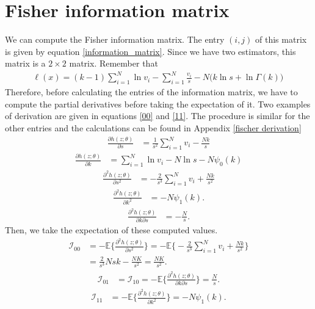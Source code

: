 \documentclass[final]{aomart}
\newtheorem[{}\it]{thm}{Theorem}[section]
\theoremstyle{definition}
\newtheorem*[{}\it]{notation}{Notation}
\numberwithin{equation}{section}
\newcommand{\fisher}{\mathcal{I}} %
\begin{document}
\section{Fisher information matrix}
We can compute the Fisher information matrix. The entry $(i,j)$ of this matrix is given by equation \ref{information_matrix}. Since we have two estimators, this matrix is a $2\times 2$ matrix. Remember that
\begin{align}
	\ell(x) = (k-1) \sum_{i=1}^{N}\ln v_i - \sum_{i=1}^{N} \frac{v_i}{s} - N \big(k \ln s + \ln \Gamma(k)\big)\,
\end{align}
Therefore, before calculating the entries of the information matrix, we have to compute the partial derivatives before taking the expectation of it. Two examples of derivation are given in equations \ref{00} and \ref{11}. The procedure is similar for the other entries and the calculations can be found in Appendix \ref{fischer derivation}
\begin{align}
	\frac{\partial h(z;\theta)}{\partial s} & = \frac{1}{s^2}\sum_{i=1}^{N}v_i - \frac{Nk}{s}
\end{align}
\begin{align}
	\frac{\partial h(z;\theta)}{\partial k} & = \sum_{i=1}^{N}\ln v_i - N\ln s - N\psi_0(k)
\end{align}
\begin{align}
	\frac{\partial^2h(z;\theta)}{\partial s^2} & = -\frac{2}{s^3}\sum_{i=1}^{N}v_i + \frac{Nk}{s^2}
	\label{00}
	\end{align}
\begin{align}
	\frac{\partial^2 h(z; \theta)}{\partial k^2} & = -N\psi_1(k).
	\label{11}
\end{align}
\begin{align}
		\frac{\partial^2 h(z; \theta)}{\partial k\partial s} & = -\frac{N}{s} .
\end{align}
Then, we take the expectation of these computed values.
\begin{align}
	\fisher_{00} & = -\mathbb{E}\bigg\{ \frac{\partial^2 h(z;\theta)}{\partial s^2} \bigg\} = -\mathbb{E}\bigg\{ -\frac{2}{s^3}\sum_{i=1}^{N}v_i + \frac{Nk}{s^2} \bigg\}\\
					   & = \frac{2}{s^3}Nsk - \frac{NK}{s^2} = \frac{NK}{s^2}.
\end{align}
\begin{align}
	\fisher_{01} & = \fisher_{10} =  -\mathbb{E}\bigg\{ \frac{\partial^2 h(z;\theta)}{\partial k \partial s} \bigg\} = \frac{N}{s}.
\end{align}
\begin{align}
	\fisher_{11} & = -\mathbb{E}\bigg\{ \frac{\partial^2 h(z;\theta)}{\partial k^2} \bigg\} = -N\psi_1(k).
\end{align}
\end{document}
